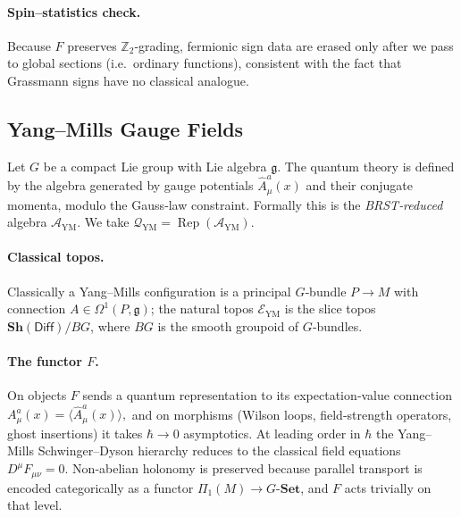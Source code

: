 \medskip

\paragraph{Spin–statistics check.}
Because $F$ preserves $\mathbb Z_{2}$‑grading, fermionic sign data are erased
only after we pass to global sections (i.e.\ ordinary functions), consistent
with the fact that Grassmann signs have no classical analogue.

\bigskip

\subsection{Yang–Mills Gauge Fields}\label{subsec:YM}

Let $G$ be a compact Lie group with Lie algebra $\mathfrak g$.
The quantum theory is defined by the algebra generated by gauge potentials
$\widehat A_{\mu}^{a}(x)$ and their conjugate momenta, modulo the Gauss‑law
constraint.  Formally this is the \emph{BRST‑reduced} algebra
$\mathcal A_{\mathrm{YM}}$.  We take
$\mathcal Q_{\mathrm{YM}}=\operatorname{Rep}(\mathcal A_{\mathrm{YM}})$.

\medskip

\paragraph{Classical topos.}
Classically a Yang–Mills configuration is a principal $G$‑bundle $P\to M$
with connection $A\in\Omega^{1}(P,\mathfrak g)$; the natural topos
$\mathcal E_{\mathrm{YM}}$ is the
slice topos $\mathbf{Sh}(\mathsf{Diff})/BG$, where $BG$ is the
smooth groupoid of $G$‑bundles.

\medskip

\paragraph{The functor $F$.}
On objects $F$ sends a quantum representation to its expectation‑value
connection
\(
  A_{\mu}^{a}(x)=\bigl\langle\widehat A_{\mu}^{a}(x)\bigr\rangle,
\)
and on morphisms (Wilson loops, field‑strength operators, ghost insertions)
it takes $\hbar\to0$ asymptotics.
At leading order in $\hbar$ the Yang–Mills Schwinger–Dyson hierarchy reduces
to the classical field equations $D^{\mu}F_{\mu\nu}=0$.
Non‑abelian holonomy is preserved because parallel transport is encoded
categorically as a functor
$\Pi_{1}(M)\to G\text{-}\mathbf{Set}$, and $F$ acts trivially on that level.

